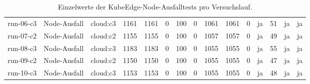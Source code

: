 \begin{table}
{\begin{tabular}{l l p{3.2cm} r r r r r r r r r r r r}
run-06-c3 & Node-Ausfall & cloud:c3 & 1161 & 1161 & 0 & 100 & 0 & 1061 & 1061 & 0 & ja & 51 & ja & ja \\
run-07-c2 & Node-Ausfall & cloud:c2 & 1155 & 1155 & 0 & 100 & 0 & 1057 & 1057 & 0 & ja & 49 & ja & ja \\
run-08-c3 & Node-Ausfall & cloud:c3 & 1183 & 1183 & 0 & 100 & 0 & 1055 & 1055 & 0 & ja & 55 & ja & ja \\
run-09-c2 & Node-Ausfall & cloud:c2 & 1150 & 1150 & 0 & 100 & 0 & 1055 & 1055 & 0 & ja & 47 & ja & ja \\
run-10-c3 & Node-Ausfall & cloud:c3 & 1153 & 1153 & 0 & 100 & 0 & 1055 & 1055 & 0 & ja & 48 & ja & ja \\
\bottomrule
\end{tabular}%
}
\caption{Einzelwerte der KubeEdge-Node-Ausfalltests pro Versuchslauf.}
\label{tab:appendix-kubeedge-node-failure-runs}
\end{table}
